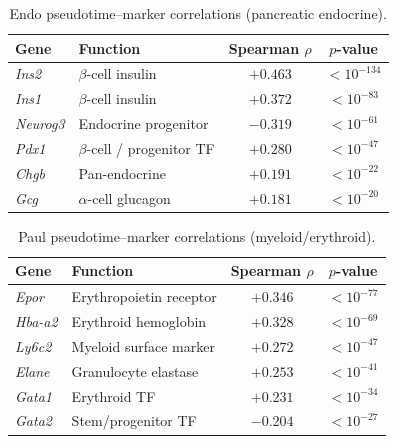 \documentclass[preprint,12pt,number]{elsarticle}
\begin{document}
\begin{table}[!t]
    \centering
    \caption{Endo pseudotime--marker correlations (pancreatic endocrine).}
    \label{tab:endo_markers}
    \begin{tabular}{llcc}
        \toprule
        Gene & Function & Spearman $\rho$ & $p$-value \\
        \midrule
        \textit{Ins2}    & $\beta$-cell insulin        & $+0.463$ & $< 10^{-134}$ \\
        \textit{Ins1}    & $\beta$-cell insulin        & $+0.372$ & $< 10^{-83}$  \\
        \textit{Neurog3} & Endocrine progenitor        & $-0.319$ & $< 10^{-61}$  \\
        \textit{Pdx1}    & $\beta$-cell / progenitor TF & $+0.280$ & $< 10^{-47}$  \\
        \textit{Chgb}    & Pan-endocrine               & $+0.191$ & $< 10^{-22}$  \\
        \textit{Gcg}     & $\alpha$-cell glucagon      & $+0.181$ & $< 10^{-20}$  \\
        \bottomrule
    \end{tabular}
\end{table}

\begin{table}[!t]
    \centering
    \caption{Paul pseudotime--marker correlations (myeloid/erythroid).}
    \label{tab:paul_markers}
    \begin{tabular}{llcc}
        \toprule
        Gene & Function & Spearman $\rho$ & $p$-value \\
        \midrule
        \textit{Epor}   & Erythropoietin receptor  & $+0.346$ & $< 10^{-77}$ \\
        \textit{Hba-a2} & Erythroid hemoglobin     & $+0.328$ & $< 10^{-69}$ \\
        \textit{Ly6c2}  & Myeloid surface marker   & $+0.272$ & $< 10^{-47}$ \\
        \textit{Elane}  & Granulocyte elastase     & $+0.253$ & $< 10^{-41}$ \\
        \textit{Gata1}  & Erythroid TF             & $+0.231$ & $< 10^{-34}$ \\
        \textit{Gata2}  & Stem/progenitor TF       & $-0.204$ & $< 10^{-27}$ \\
        \bottomrule
    \end{tabular}
\end{table}
\end{document}
